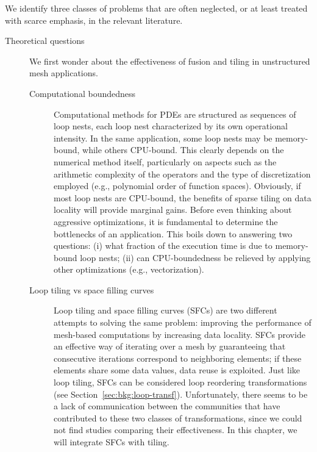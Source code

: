 We identify three classes of problems that are often neglected, or at least treated with scarce emphasis, in the relevant literature. 

\begin{description}
\item[Theoretical questions] We first wonder about the effectiveness of fusion and tiling in unstructured mesh applications.

\begin{description}
\item[Computational boundedness] Computational methods for PDEs are structured as sequences of loop nests, each loop nest characterized by its own operational intensity. In the same application, some loop nests may be memory-bound, while others CPU-bound. This clearly depends on the numerical method itself, particularly on aspects such as the arithmetic complexity of the operators and the type of discretization employed (e.g., polynomial order of function spaces). Obviously, if most loop nests are CPU-bound, the benefits of sparse tiling on data locality will provide marginal gains. Before even thinking about aggressive optimizations, it is fundamental to determine the bottlenecks of an application. This boils down to answering two questions: (i) what fraction of the execution time is due to memory-bound loop nests; (ii) can CPU-boundedness be relieved by applying other optimizations (e.g., vectorization).
\item[Loop tiling vs space filling curves] Loop tiling and space filling curves (SFCs) are two different attempts to solving the same problem: improving the performance of mesh-based computations by increasing data locality. SFCs provide an effective way of iterating over a mesh by guaranteeing that consecutive iterations correspond to neighboring elements; if these elements share some data values, data reuse is exploited. Just like loop tiling, SFCs can be considered loop reordering transformations (see Section~\ref{sec:bkg:loop-transf}). Unfortunately, there seems to be a lack of communication between the communities that have contributed to these two classes of transformations, since we could not find studies comparing their effectiveness. In this chapter, we will integrate SFCs with tiling.
\end{description}


\end{description}
